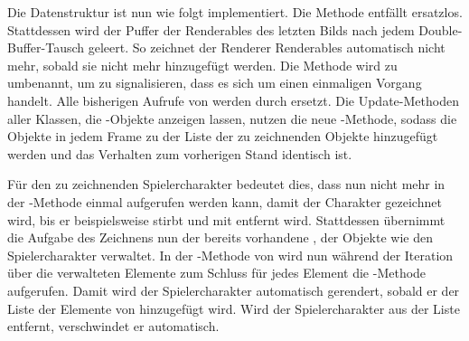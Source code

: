 Die Datenstruktur ist nun wie folgt implementiert. Die Methode  entfällt ersatzlos. Stattdessen wird der Puffer der Renderables des letzten Bilds nach jedem  Double-Buffer-Tausch geleert. So zeichnet der Renderer Renderables automatisch nicht mehr, sobald sie nicht mehr hinzugefügt werden. Die Methode  wird zu  umbenannt, um zu signalisieren, dass es sich um einen einmaligen Vorgang handelt. Alle bisherigen Aufrufe von  werden durch  ersetzt. Die Update-Methoden aller Klassen, die -Objekte anzeigen lassen, nutzen die neue -Methode, sodass die Objekte in jedem Frame zu der Liste der zu zeichnenden Objekte hinzugefügt werden und das Verhalten zum vorherigen Stand identisch ist.

\begin{example}
	Für den zu zeichnenden Spielercharakter bedeutet dies, dass nun nicht mehr in der -Methode einmal  aufgerufen werden kann, damit der Charakter gezeichnet wird, bis er beispielsweise stirbt und mit  entfernt wird. Stattdessen übernimmt die Aufgabe des Zeichnens nun der bereits vorhandene , der Objekte wie den Spielercharakter verwaltet. In der -Methode von  wird nun während der Iteration über die verwalteten Elemente zum Schluss für jedes Element die -Methode aufgerufen. Damit wird der Spielercharakter automatisch gerendert, sobald er der Liste der Elemente von  hinzugefügt wird. Wird der Spielercharakter aus der Liste entfernt, verschwindet er automatisch.
\end{example}

